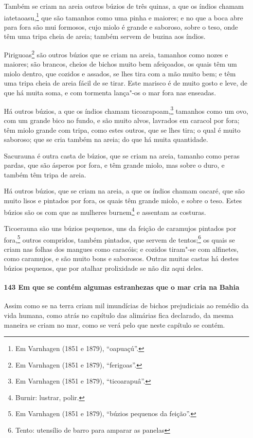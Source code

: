 \begin{linenumbers}
Também se criam na areia outros búzios de três quinas, a que os índios chamam
iatetaoasu,\footnote{ Em Varnhagen (1851 e 1879), ``oapuaçú''.} que são tamanhos como uma
pinha e maiores; e no que a boca abre para fora são mui formosos, cujo miolo é grande e
saboroso, sobre o teso, onde têm uma tripa cheia de areia; também servem de buzina aos
índios.

Piriguoas\footnote{ Em Varnhagen (1851 e 1879), ``ferigoas''.} são outros búzios que se
criam na areia, tamanhos como nozes e maiores; são brancos, cheios de bichos muito bem
afeiçoados, os quais têm um miolo dentro, que cozidos e assados, se lhes tira com a mão
muito bem; e têm uma tripa cheia de areia fácil de se tirar. Este marisco é de muito gosto
e leve, de que há muita soma, e com tormenta lança"-os o mar fora nas enseadas.

Há outros búzios, a que os índios chamam ticoarapoam,\footnote{ Em Varnhagen (1851 e 1879),
``ticoarapuâ''.} tamanhos como um ovo, com um grande bico no fundo, e são muito alvos,
lavrados em caracol por fora; têm miolo grande com tripa, como estes outros, que se lhes
tira; o qual é muito saboroso; que se cria também na areia; do que há muita quantidade.

Sacurauna é outra casta de búzios, que se criam na areia, tamanho como peras pardas, que
são ásperos por fora, e têm grande miolo, mas sobre o duro, e também têm tripa de areia.

Há outros búzios, que se criam na areia, a que os índios chamam oacaré, que são muito
lisos e pintados por fora, os quais têm grande miolo, e sobre o teso. Estes búzios são os
com que as mulheres burnem\footnote{ Burnir: lustrar, polir.} e assentam as costuras.

Ticoerauna são uns búzios pequenos, uns da feição de caramujos pintados por
fora,\footnote{ Em Varnhagen (1851 e 1879), ``búzios pequenos da feição''.} outros
compridos, também pintados, que servem de tentos;\footnote{ Tento: utensílio de barro para
amparar as panelas} os quais se criam nas folhas dos mangues como
caracóis; e cozidos tiram"-se com alfinetes, como caramujos, e são muito bons e saborosos.
Outras muitas castas há destes búzios pequenos, que por atalhar prolixidade se não diz
aqui deles.

\paragraph{143 Em que se contém algumas estranhezas que o mar cria na Bahia}\quad
Assim como se na terra criam mil imundícias de bichos prejudiciais ao remédio da vida
humana, como atrás no capítulo das alimárias fica declarado, da mesma maneira se criam no
mar, como se verá pelo que neste capítulo se contém.


\end{linenumbers}

